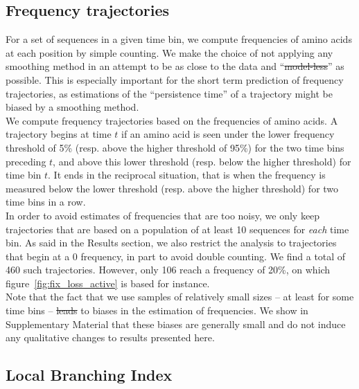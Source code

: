 \documentclass[reprint,amsmath,amssymb,superscriptaddress,showpacs,rmp]{revtex4-1}
\providecommand{\DIFadd}[1]{{\protect\color{blue}\uwave{#1}}} %
\providecommand{\DIFdel}[1]{{\protect\color{red}\sout{#1}}}                      %
\providecommand{\DIFaddbegin}{} %
\providecommand{\DIFaddend}{} %
\providecommand{\DIFdelbegin}{} %
\providecommand{\DIFdelend}{} %
\newcommand{\DIFscaledelfig}{0.5}
\newlength{\DIFdelgraphicswidth} %
\newlength{\DIFdelgraphicsheight} %
\newcommand{\DIFaddincludegraphics}[2][]{{\color{blue}\fbox{\DIFOincludegraphics[#1]{#2}}}} %
\newcommand{\DIFdelincludegraphics}[2][]{%
\sbox{\DIFdelgraphicsbox}{\DIFOincludegraphics[#1]{#2}}%
\settoboxwidth{\DIFdelgraphicswidth}{\DIFdelgraphicsbox} %
\settoboxtotalheight{\DIFdelgraphicsheight}{\DIFdelgraphicsbox} %
\scalebox{\DIFscaledelfig}{%
\parbox[b]{\DIFdelgraphicswidth}{\usebox{\DIFdelgraphicsbox}\\[-\baselineskip] \rule{\DIFdelgraphicswidth}{0em}}\llap{\resizebox{\DIFdelgraphicswidth}{\DIFdelgraphicsheight}{%
\setlength{\unitlength}{\DIFdelgraphicswidth}%
\begin{picture}(1,1)%
\thicklines\linethickness{2pt} %
{\color[rgb]{1,0,0}\put(0,0){\framebox(1,1){}}}%
{\color[rgb]{1,0,0}\put(0,0){\line( 1,1){1}}}%
{\color[rgb]{1,0,0}\put(0,1){\line(1,-1){1}}}%
\end{picture}%
}\hspace*{3pt}}} %
} %
\DeclareRobustCommand{\DIFaddbegin}{\DIFOaddbegin \let\includegraphics\DIFaddincludegraphics} %
\DeclareRobustCommand{\DIFaddend}{\DIFOaddend \let\includegraphics\DIFOincludegraphics} %
\DeclareRobustCommand{\DIFdelbegin}{\DIFOdelbegin \let\includegraphics\DIFdelincludegraphics} %
\DeclareRobustCommand{\DIFdelend}{\DIFOaddend \let\includegraphics\DIFOincludegraphics} %
\begin{document}
\subsection*{Frequency trajectories} %
\label{sub:frequency_trajectories}

	For a set of sequences in a given time bin, we compute frequencies of amino acids at each position by simple counting. We make the choice of not applying any smoothing method in an attempt to be as close to the data and ``\DIFdelbegin \DIFdel{model-less}\DIFdelend \DIFaddbegin \DIFadd{model-free}\DIFaddend '' as possible. This is especially important for the short term prediction of frequency trajectories, as estimations of the ``persistence time'' of a trajectory might be biased by a smoothing method. \\
	We compute frequency trajectories based on the frequencies of amino acids. A trajectory begins at time $t$ if an amino acid is seen under the lower frequency threshold of 5\% (resp. above the higher threshold of 95\%) for the two time bins preceding $t$, and above this lower threshold (resp. below the higher threshold) for time bin $t$. It ends in the reciprocal situation, that is when the frequency is measured below the lower threshold (resp. above the higher threshold) for two time bins in a row. \\
	In order to avoid estimates of frequencies that are too noisy, we only keep trajectories that are based on a population of at least 10 sequences for \emph{each} time bin. As said in the Results section, we also restrict the analysis to trajectories that begin at a $0$ frequency, in part to avoid double counting. We find a total of 460 such trajectories. However, only 106 reach a frequency of 20\%, on which figure~\ref{fig:fix_loss_active} is based for instance.  \\
	Note that the fact that we use samples of relatively small sizes -- at least for some time bins -- \DIFdelbegin \DIFdel{leads }\DIFdelend \DIFaddbegin \DIFadd{can lead }\DIFaddend to biases in the estimation of frequencies. We show in Supplementary Material that these biases are generally small and do not induce any qualitative changes to results presented here.


\subsection*{Local Branching Index} %
\label{sub:local_branching_index}
\end{document}
